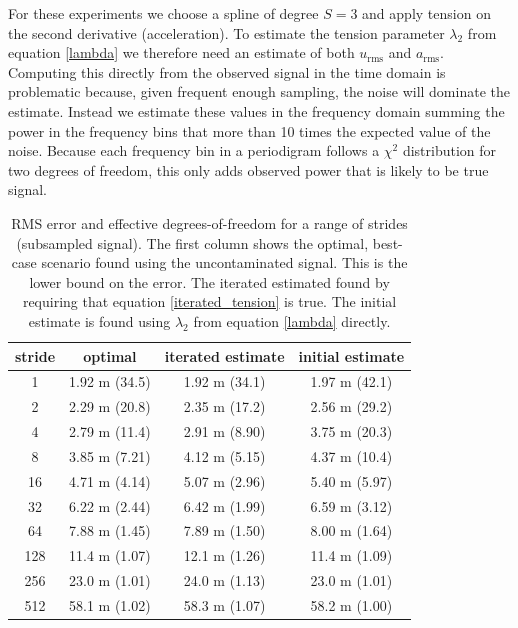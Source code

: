 \documentclass[twocol]{ametsoc}
\begin{document}
For these experiments we choose a spline of degree $S=3$ and apply tension on the second derivative (acceleration). To estimate the tension parameter $\lambda_2$ from equation \ref{lambda} we therefore need an estimate of both $u_{\textrm{rms}}$ and $a_{\textrm{rms}}$. Computing this directly from the observed signal in the time domain is problematic because, given frequent enough sampling, the noise will dominate the estimate. Instead we estimate these values in the frequency domain summing the power in the frequency bins that more than 10 times the expected value of the noise. Because each frequency bin in a periodigram follows a $\chi^2$ distribution for two degrees of freedom, this only adds observed power that is likely to be true signal.

\begin{table}[h]
\begin{tabular}{c | ccc}
stride & optimal & iterated estimate & initial estimate \\ \hline \hline
1 & 1.92 m (34.5) &  1.92 m (34.1) &  1.97 m (42.1) \\ 
2 & 2.29 m (20.8) &  2.35 m (17.2) &  2.56 m (29.2) \\ 
4 & 2.79 m (11.4) &  2.91 m (8.90) &  3.75 m (20.3) \\ 
8 & 3.85 m (7.21) &  4.12 m (5.15) &  4.37 m (10.4) \\ 
16 & 4.71 m (4.14) &  5.07 m (2.96) &  5.40 m (5.97) \\ 
32 & 6.22 m (2.44) &  6.42 m (1.99) &  6.59 m (3.12) \\ 
64 & 7.88 m (1.45) &  7.89 m (1.50) &  8.00 m (1.64) \\ 
128 & 11.4 m (1.07) &  12.1 m (1.26) &  11.4 m (1.09) \\ 
256 & 23.0 m (1.01) &  24.0 m (1.13) &  23.0 m (1.01) \\ 
512 & 58.1 m (1.02) &  58.3 m (1.07) &  58.2 m (1.00) \\ 
\end{tabular}
\caption{RMS error and effective degrees-of-freedom for a range of strides (subsampled signal). The first column shows the optimal, best-case scenario found using the uncontaminated signal. This is the lower bound on the error. The iterated estimated found by requiring that equation \ref{iterated_tension} is true. The initial estimate is found using $\lambda_2$ from equation \ref{lambda} directly. }
\label{fit_results}
\end{table}
\end{document}
